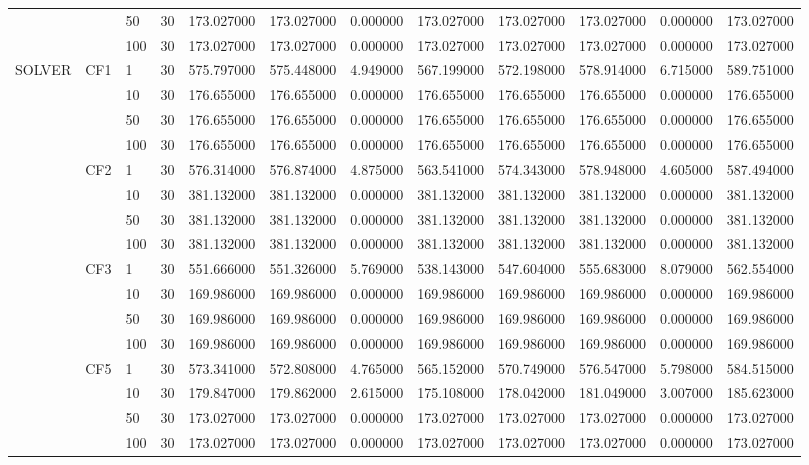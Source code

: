 \begin{tabular}{lllrrrrrrrrr}
 &  & 50 & 30 & 173.027000 & 173.027000 & 0.000000 & 173.027000 & 173.027000 & 173.027000 & 0.000000 & 173.027000 \\
 &  & 100 & 30 & 173.027000 & 173.027000 & 0.000000 & 173.027000 & 173.027000 & 173.027000 & 0.000000 & 173.027000 \\
\cline{1-12} \cline{2-12}
\multirow[t]{16}{*}{SOLVER} & \multirow[t]{4}{*}{CF1} & 1 & 30 & 575.797000 & 575.448000 & 4.949000 & 567.199000 & 572.198000 & 578.914000 & 6.715000 & 589.751000 \\
 &  & 10 & 30 & 176.655000 & 176.655000 & 0.000000 & 176.655000 & 176.655000 & 176.655000 & 0.000000 & 176.655000 \\
 &  & 50 & 30 & 176.655000 & 176.655000 & 0.000000 & 176.655000 & 176.655000 & 176.655000 & 0.000000 & 176.655000 \\
 &  & 100 & 30 & 176.655000 & 176.655000 & 0.000000 & 176.655000 & 176.655000 & 176.655000 & 0.000000 & 176.655000 \\
\cline{2-12}
 & \multirow[t]{4}{*}{CF2} & 1 & 30 & 576.314000 & 576.874000 & 4.875000 & 563.541000 & 574.343000 & 578.948000 & 4.605000 & 587.494000 \\
 &  & 10 & 30 & 381.132000 & 381.132000 & 0.000000 & 381.132000 & 381.132000 & 381.132000 & 0.000000 & 381.132000 \\
 &  & 50 & 30 & 381.132000 & 381.132000 & 0.000000 & 381.132000 & 381.132000 & 381.132000 & 0.000000 & 381.132000 \\
 &  & 100 & 30 & 381.132000 & 381.132000 & 0.000000 & 381.132000 & 381.132000 & 381.132000 & 0.000000 & 381.132000 \\
\cline{2-12}
 & \multirow[t]{4}{*}{CF3} & 1 & 30 & 551.666000 & 551.326000 & 5.769000 & 538.143000 & 547.604000 & 555.683000 & 8.079000 & 562.554000 \\
 &  & 10 & 30 & 169.986000 & 169.986000 & 0.000000 & 169.986000 & 169.986000 & 169.986000 & 0.000000 & 169.986000 \\
 &  & 50 & 30 & 169.986000 & 169.986000 & 0.000000 & 169.986000 & 169.986000 & 169.986000 & 0.000000 & 169.986000 \\
 &  & 100 & 30 & 169.986000 & 169.986000 & 0.000000 & 169.986000 & 169.986000 & 169.986000 & 0.000000 & 169.986000 \\
\cline{2-12}
 & \multirow[t]{4}{*}{CF5} & 1 & 30 & 573.341000 & 572.808000 & 4.765000 & 565.152000 & 570.749000 & 576.547000 & 5.798000 & 584.515000 \\
 &  & 10 & 30 & 179.847000 & 179.862000 & 2.615000 & 175.108000 & 178.042000 & 181.049000 & 3.007000 & 185.623000 \\
 &  & 50 & 30 & 173.027000 & 173.027000 & 0.000000 & 173.027000 & 173.027000 & 173.027000 & 0.000000 & 173.027000 \\
 &  & 100 & 30 & 173.027000 & 173.027000 & 0.000000 & 173.027000 & 173.027000 & 173.027000 & 0.000000 & 173.027000 \\
\cline{1-12} \cline{2-12}
\bottomrule
\end{tabular}
